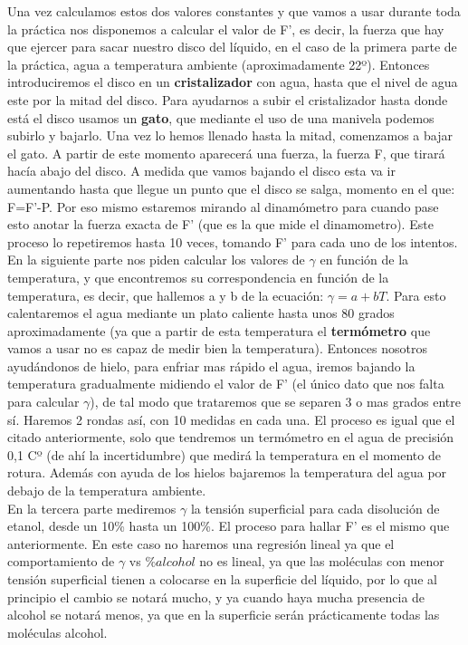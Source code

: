 \documentclass[12pt,a4paper]{book}
\begin{document}
Una vez calculamos estos dos valores constantes y que vamos a usar durante toda la práctica nos disponemos a calcular el valor de F', es decir, la fuerza que hay que ejercer para sacar nuestro disco del líquido, en el caso de la primera parte de la práctica, agua a temperatura ambiente (aproximadamente 22º). Entonces introduciremos el disco en un \textbf{cristalizador} con agua, hasta que el nivel de agua este por la mitad del disco. Para ayudarnos a subir el cristalizador hasta donde está el disco usamos un \textbf{gato}, que mediante el uso de una manivela podemos subirlo y  bajarlo. Una vez lo hemos llenado hasta la mitad, comenzamos a bajar el gato. A partir de este momento aparecerá una fuerza, la fuerza F, que tirará hacía abajo del disco. A medida que vamos bajando el disco esta va ir aumentando hasta que llegue un punto que el disco se salga, momento en el que: F=F'-P. Por eso mismo estaremos mirando al dinamómetro para cuando pase esto anotar la fuerza exacta de F' (que es la que mide el dinamometro). Este proceso lo repetiremos hasta 10 veces, tomando F' para cada uno de los intentos. \\

En la siguiente parte nos piden calcular los valores de $\gamma$ en función de la temperatura, y que encontremos su correspondencia en función de la temperatura, es decir, que hallemos a y b de la ecuación: $\gamma = a +bT$. Para esto calentaremos el agua mediante un plato caliente hasta unos 80 grados aproximadamente (ya que a partir de esta temperatura el \textbf{termómetro} que vamos a usar no es capaz de medir bien la temperatura). Entonces nosotros ayudándonos de hielo, para enfriar mas rápido el agua, iremos bajando la temperatura gradualmente midiendo el valor de F' (el único dato que nos falta para calcular $\gamma$), de tal modo que trataremos que se separen 3 o mas grados entre sí. Haremos 2 rondas así, con 10 medidas en cada una. El proceso es igual que el citado anteriormente, solo que tendremos un termómetro en el agua de precisión 0,1 Cº (de ahí la incertidumbre) que medirá la temperatura en el momento de rotura. Además con ayuda de los hielos bajaremos la temperatura del agua por debajo de la temperatura ambiente. \\

En la tercera parte mediremos $\gamma$ la tensión superficial para cada disolución de etanol, desde un 10\% hasta un 100\%. El proceso para hallar F' es el mismo que anteriormente. En este caso no haremos una regresión lineal ya que el comportamiento de $\gamma$ vs $\% alcohol$ no es lineal, ya que las moléculas con menor tensión superficial tienen a colocarse en la superficie del líquido, por lo que al principio el cambio se notará mucho, y ya cuando haya mucha presencia de alcohol se notará menos, ya que en la superficie serán prácticamente todas las moléculas alcohol.
\end{document}
